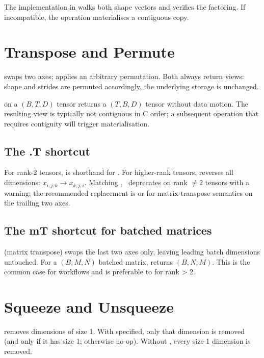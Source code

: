 The implementation in  walks both shape
vectors and verifies the factoring. If incompatible, the operation
materialises a contiguous copy.

\section{Transpose and Permute}
\label{sec:shape_view:permute}

 swaps two axes; 
applies an arbitrary permutation. Both always return views: shape
and strides are permuted accordingly, the underlying storage is
unchanged.

 on a $(B, T, D)$ tensor returns a
$(T, B, D)$ tensor without data motion. The resulting view is
typically not contiguous in C order; a subsequent operation that
requires contiguity will trigger materialisation.

\subsection{The .T shortcut}
\label{ssec:shape_view:t_shortcut}

For rank-2 tensors,  is shorthand for
. For higher-rank tensors, 
reverses all dimensions: \(x_{i,j,k} \to x_{k,j,i}\). Matching
, \Lucid\ deprecates  on rank \(\neq 2\)
tensors with a warning; the recommended replacement is
 or  for matrix-transpose
semantics on the trailing two axes.

\subsection{The mT shortcut for batched matrices}
\label{ssec:shape_view:mt_shortcut}

 (matrix transpose) swaps the last two axes only,
leaving leading batch dimensions untouched. For a $(B, M, N)$
batched matrix,  returns $(B, N, M)$. This is the
common case for  workflows and is preferable to
 for rank > 2.

\section{Squeeze and Unsqueeze}
\label{sec:shape_view:squeeze}

 removes dimensions of size 1. With
 specified, only that dimension is removed (and only if
it has size 1; otherwise no-op). Without , every
size-1 dimension is removed.

